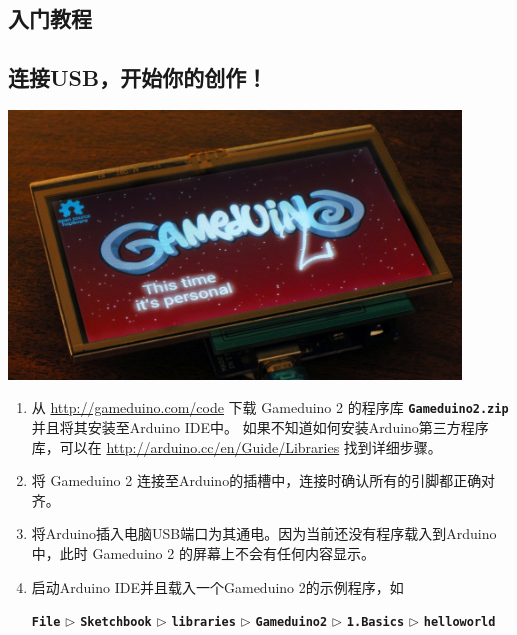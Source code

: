 \documentclass[10pt]{book}
\newcommand{\gdtwo}{Gameduino 2 }
\newcommand{\mach}[1]{\texttt{\textbf{#1}}}
\begin{document}
\begin{CJK}{UTF8}{gkai}
\vfill


\endgroup

\thispagestyle{empty}
\pagestyle{headings}

\renewcommand{\contentsname}{目录}
\tableofcontents

\part{入门教程}

\chapter{连接USB，开始你的创作！}

\begin{center}
\includegraphics[width=0.9\textwidth]{assets/plugin.jpg}
\end{center}

\begin{enumerate}

\item
从 \url{http://gameduino.com/code} 下载 \gdtwo 的程序库 \mach{Gameduino2.zip} 并且将其安装至Arduino IDE中。
如果不知道如何安装Arduino第三方程序库，可以在 \url{http://arduino.cc/en/Guide/Libraries} 找到详细步骤。

\item
将 \gdtwo 连接至Arduino的插槽中，连接时确认所有的引脚都正确对齐。

\item
将Arduino插入电脑USB端口为其通电。因为当前还没有程序载入到Arduino中，此时 \gdtwo 的屏幕上不会有任何内容显示。

\item
启动Arduino IDE并且载入一个Gameduino 2的示例程序，如 \\
\begin{small}
\mach{File} $\triangleright$
\mach{Sketchbook} $\triangleright$
\mach{libraries} $\triangleright$
\mach{Gameduino2} $\triangleright$
\mach{1.Basics} $\triangleright$
\mach{helloworld}
\end{small}


\end{enumerate}
\end{CJK}
\end{document}
